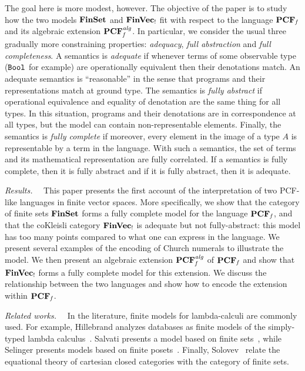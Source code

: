 \documentclass[10pt]{article}
\theoremstyle{plain}
\theoremstyle{definition}
\newcommand{\FinSet}{\mbox{\bf FinSet}}
\newcommand{\FinVec}{\mbox{\bf FinVec}}
\newcommand{\bit}{{\tt Bool}}
\begin{document}
The goal here is more modest, however. The objective of the paper is to study how the two models
${\FinSet}$ and  $\FinVec_!$ fit
with respect to the language ${\bf PCF}_{\it f}$ and its algebraic extension
${\bf PCF}_{\it f}^{\it alg}$. In particular, we consider the usual three gradually 
more constraining properties: \textit{adequacy}, \textit{full abstraction} and
\textit{full completeness}.
A semantics is \textit{adequate} if whenever terms of some observable type
($\bit$ for example) are operationally equivalent then their
denotations match. An adequate semantics is ``reasonable'' in the
sense that programs and their representations match at ground type.
The semantics is \textit{fully abstract} if operational equivalence and
equality of denotation are the same thing for all types. In this
situation, programs and their denotations are in correspondence at all
types, but the model can contain non-representable
elements.
Finally, the semantics is \textit{fully complete} if moreover, every element in
the image of a type $A$ is representable by a term in the language.
With such a semantics, the set of terms and its mathematical
representation are fully correlated. If a semantics is fully complete,
then it is fully abstract and if it is fully abstract, then it is adequate.



\noindent
{\em Results.}~~
This paper presents the first account of the interpretation of two
PCF-like languages in finite vector spaces.
More specifically, we show that the category of finite sets
${\FinSet}$ forms a fully complete model for the language ${\bf PCF}_{\it f}$,
and that the coKleisli category ${\FinVec}_!$ is adequate but not
fully-abstract: this model has too many points compared to what one
can express in the language. We present several examples of the
encoding of Church numerals to illustrate the model.
We then present an algebraic extension ${\bf PCF}_{\it f}^{\it alg}$
of ${\bf PCF}_{\it f}$ and show that
${\FinVec}_!$ forms a fully complete model for this extension.
We discuss the relationship between the two languages and show how to
encode the extension within ${\bf PCF}_{\it f}$.


\noindent
{\em Related works.}~~
In the literature, finite models for lambda-calculi are commonly
used. For example, Hillebrand analyzes databases as finite
models of the simply-typed
lambda calculus~\cite{hillebrand-phd}. Salvati presents
a model based on finite sets~\cite{fin-model}, while
Selinger presents models based on finite
posets~\cite{fin-model-fin-posets}. Finally, Solovev~\cite{soloviev83}
relate the equational theory of cartesian closed categories
with the category of finite sets.
\end{document}
